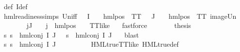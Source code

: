 \begin{isabellebody}
\ {\isasymPsi}{\isacharunderscore}{\kern0pt}def\ I{\isacharprime}{\kern0pt}{\isacharunderscore}{\kern0pt}def\isanewline
\ \ \ \ \ \ \isamarkupfalse%
\ hml{\isacharunderscore}{\kern0pt}readiness{\isachardot}{\kern0pt}simps\ Un{\isacharunderscore}{\kern0pt}iff\ {\isacartoucheopen}{\isasymforall}{\isasympsi}{\isasymin}{\isasymPsi}\ {\isacharbackquote}{\kern0pt}\ I{\isacharprime}{\kern0pt}{\isachardot}{\kern0pt}\ {\isasymexists}{\isasymalpha}{\isachardot}{\kern0pt}\ {\isasympsi}\ {\isacharequal}{\kern0pt}\ hml{\isacharunderscore}{\kern0pt}pos\ {\isasymalpha}\ TT{\isacartoucheclose}\ {\isacartoucheopen}{\isasymforall}{\isasympsi}{\isasymin}{\isasymPsi}\ {\isacharbackquote}{\kern0pt}\ J{\isachardot}{\kern0pt}\ {\isasymexists}{\isasymalpha}{\isachardot}{\kern0pt}\ {\isasympsi}\ {\isacharequal}{\kern0pt}\ hml{\isacharunderscore}{\kern0pt}pos\ {\isasymalpha}\ TT{\isacartoucheclose}\ image{\isacharunderscore}{\kern0pt}Un\isanewline
\ \ \ \ \ \ \isamarkupfalse%
\ {\isacartoucheopen}{\isasymforall}j{\isasymin}J{\isachardot}{\kern0pt}\ {\isasymexists}{\isasymalpha}\ {\isasymchi}{\isachardot}{\kern0pt}\ {\isasymPhi}\ j\ {\isacharequal}{\kern0pt}\ hml{\isacharunderscore}{\kern0pt}pos\ {\isasymalpha}\ {\isasymchi}\ {\isasymand}\ TT{\isacharunderscore}{\kern0pt}like\ {\isasymchi}{\isacartoucheclose}\ \isamarkupfalse%
\ fastforce\isanewline
\ \ \ \ \isamarkupfalse%
\ \isamarkupfalse%
\ {\isacharquery}{\kern0pt}thesis\ \isanewline
\ \ \ \ \ \ \isamarkupfalse%
\ {\isacartoucheopen}{\isasymforall}s{\isachardot}{\kern0pt}\ {\isacharparenleft}{\kern0pt}s\ {\isasymTurnstile}\ hml{\isacharunderscore}{\kern0pt}conj\ I\ J\ {\isasymPhi}{\isacharparenright}{\kern0pt}\ {\isacharequal}{\kern0pt}\ {\isacharparenleft}{\kern0pt}s\ {\isasymTurnstile}\ {\isacharparenleft}{\kern0pt}hml{\isacharunderscore}{\kern0pt}conj\ I{\isacharprime}{\kern0pt}\ J\ {\isasymPsi}{\isacharparenright}{\kern0pt}{\isacharparenright}{\kern0pt}{\isacartoucheclose}\ \isamarkupfalse%
\ blast\isanewline
\ \ \isamarkupfalse%
\isanewline
\ \ \ \ \isamarkupfalse%
\ {}\isanewline
\ \ \ \ \isamarkupfalse%
\ {\isachardoublequoteopen}{\isasymforall}s{\isachardot}{\kern0pt}\ {\isasymnot}s\ {\isasymTurnstile}\ {\isacharparenleft}{\kern0pt}hml{\isacharunderscore}{\kern0pt}conj\ I\ J\ {\isasymPhi}{\isacharparenright}{\kern0pt}{\isachardoublequoteclose}\ \isanewline
\ \ \ \ \ \ \isamarkupfalse%
\ HML{\isacharunderscore}{\kern0pt}true{\isacharunderscore}{\kern0pt}TT{\isacharunderscore}{\kern0pt}like\ HML{\isacharunderscore}{\kern0pt}true{\isacharunderscore}{\kern0pt}def\ \isamarkupfalse%

\end{isabellebody}
